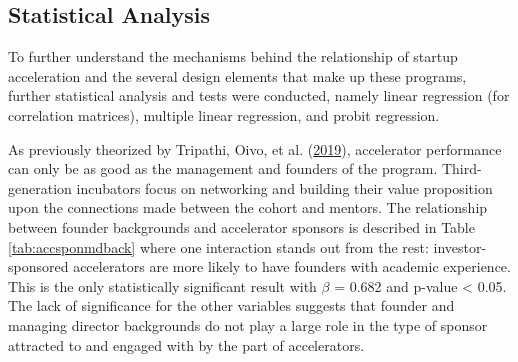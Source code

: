 \documentclass[
  12pt,
]{article}
\begin{document}
\hypertarget{statistical-analysis}{%
\subsection{Statistical Analysis}\label{statistical-analysis}}

To further understand the mechanisms behind the relationship of startup acceleration and the several design elements that make up these programs, further statistical analysis and tests were conducted, namely linear regression (for correlation matrices), multiple linear regression, and probit regression.

As previously theorized by Tripathi, Oivo, et al. (\protect\hyperlink{ref-tripathi_startup_2019}{2019}), accelerator performance can only be as good as the management and founders of the program. Third-generation incubators focus on networking and building their value proposition upon the connections made between the cohort and mentors. The relationship between founder backgrounds and accelerator sponsors is described in Table \ref{tab:accsponmdback} where one interaction stands out from the rest: investor-sponsored accelerators are more likely to have founders with academic experience. This is the only statistically significant result with \(\beta\) = 0.682 and p-value \textless{} 0.05. The lack of significance for the other variables suggests that founder and managing director backgrounds do not play a large role in the type of sponsor attracted to and engaged with by the part of accelerators.

~

\onehalfspacing
\end{document}
